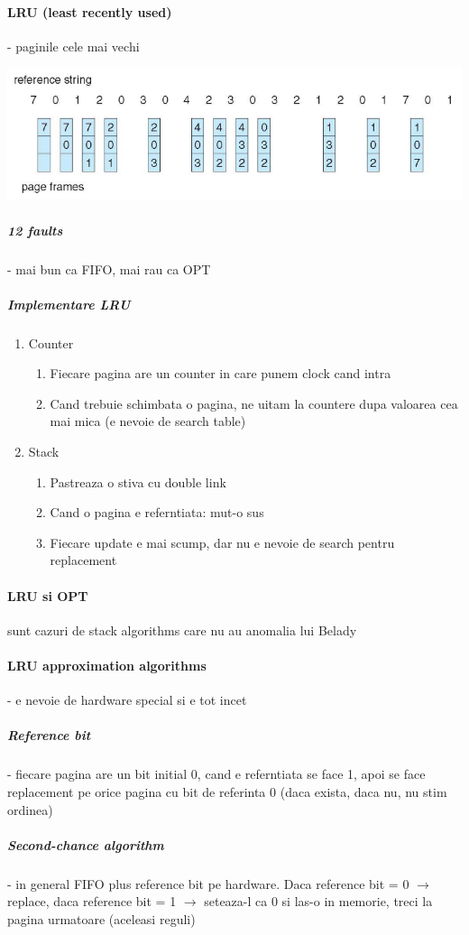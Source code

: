\documentclass{article}
\begin{document}
\paragraph*{LRU (least recently used)} - paginile cele mai vechi
\begin{center}
    \includegraphics[scale=0.4]{36-lrupf.png}
\end{center}
\subparagraph*{12 faults} - mai bun ca FIFO, mai rau ca OPT
\subparagraph*{Implementare LRU}
\begin{enumerate}
    \item Counter
          \begin{enumerate}
              \item Fiecare pagina are un counter in care punem clock cand intra
              \item Cand trebuie schimbata o pagina, ne uitam la countere dupa valoarea cea mai mica (e nevoie de search table)
          \end{enumerate}
    \item Stack
          \begin{enumerate}
              \item Pastreaza o stiva cu double link
              \item Cand o pagina e referntiata: mut-o sus
              \item Fiecare update e mai scump, dar nu e nevoie de search pentru replacement
          \end{enumerate}
\end{enumerate}

\paragraph*{LRU si OPT} sunt cazuri de stack algorithms care nu au anomalia lui Belady

\paragraph*{LRU approximation algorithms} - e nevoie de hardware special si e tot incet
\subparagraph*{Reference bit} - fiecare pagina are un bit initial 0, cand e referntiata se face 1, apoi se face replacement pe orice pagina cu bit de referinta 0 (daca exista, daca nu, nu stim ordinea)
\subparagraph*{Second-chance algorithm} - in general FIFO plus reference bit pe hardware. Daca reference bit = 0 $\rightarrow$ replace, daca reference bit = 1 $\rightarrow$ seteaza-l ca 0 si las-o in memorie, treci la pagina urmatoare (aceleasi reguli)
\end{document}

